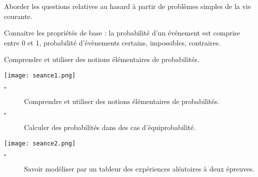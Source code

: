 \documentclass[openany]{book}
\begin{document}
\begin{seance}[Probabilités]

\begin{description}[leftmargin=*]
\item[$\square$] Aborder les questions relatives au hasard à partir de problèmes simples de la vie courante.
\item[$\square$] Connaitre les propriétés de base : la probabilité d’un événement est comprise entre 0 et 1, probabilité d'évènements certains, impossibles, contraires. 
\item[$\square$] Comprendre et utiliser des notions élémentaires de probabilités.
\end{description}
\end{seance}






\vspace{1cm}

\texttt{[image: seance1.png]} 

\begin{seance}[Probabilités]

\begin{description}
\item[$\square$] Comprendre et utiliser des notions élémentaires de probabilités.
\item[$\square$] Calculer des probabilités dans des cas d'équiprobabilité.
\end{description}
\end{seance}



\begin{minipage}{.68\linewidth}
\end{minipage}
\hfill
\begin{minipage}{.28\linewidth}
\texttt{[image: seance2.png]}
\end{minipage}


\begin{seance}[Probabilités]

\begin{description}
\item[$\square$] Savoir modéliser par un tableur des expériences aléatoires
à deux épreuves.
\end{description}
\end{seance}
\end{document}
